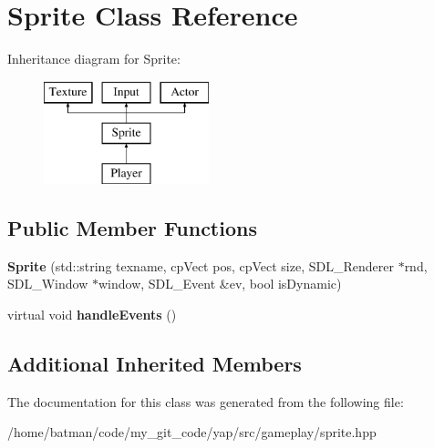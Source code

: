 \hypertarget{classSprite}{}\section{Sprite Class Reference}
\label{classSprite}
Inheritance diagram for Sprite\+:\begin{figure}[H]
\begin{center}
\leavevmode
\includegraphics[height=3.000000cm]{classSprite}
\end{center}
\end{figure}
\subsection*{Public Member Functions}
\begin{DoxyCompactItemize}
\item 
\hypertarget{classSprite_a5394486dbe5ce31050782268622ea964}{}{\bfseries Sprite} (std\+::string texname, cp\+Vect pos, cp\+Vect size, S\+D\+L\+\_\+\+Renderer $\ast$rnd, S\+D\+L\+\_\+\+Window $\ast$window, S\+D\+L\+\_\+\+Event \&ev, bool is\+Dynamic)\label{classSprite_a5394486dbe5ce31050782268622ea964}

\item 
\hypertarget{classSprite_a96e2a118c86a5bbcd95c498277f51109}{}virtual void {\bfseries handle\+Events} ()\label{classSprite_a96e2a118c86a5bbcd95c498277f51109}

\end{DoxyCompactItemize}
\subsection*{Additional Inherited Members}


The documentation for this class was generated from the following file\+:\begin{DoxyCompactItemize}
\item 
/home/batman/code/my\+\_\+git\+\_\+code/yap/src/gameplay/sprite.\+hpp\end{DoxyCompactItemize}
